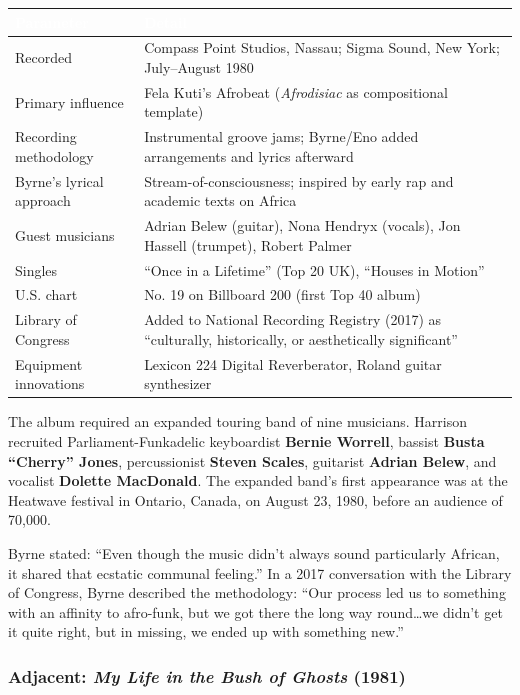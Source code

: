 \documentclass[11pt,letterpaper]{article}
\newcommand{\tableheader}[1]{\textbf{\sffamily\textcolor{white}{#1}}}
\begin{document}
\begin{center}
\begin{tabularx}{\textwidth}{L{3.5cm}X}
\toprule
{}
\tableheader{Parameter} & \tableheader{Detail} \\
\midrule
Recorded & Compass Point Studios, Nassau; Sigma Sound, New York; July--August 1980 \\
Primary influence & Fela Kuti's Afrobeat (\textit{Afrodisiac} as compositional template) \\
Recording methodology & Instrumental groove jams; Byrne/Eno added arrangements and lyrics afterward \\
Byrne's lyrical approach & Stream-of-consciousness; inspired by early rap and academic texts on Africa \\
Guest musicians & Adrian Belew (guitar), Nona Hendryx (vocals), Jon Hassell (trumpet), Robert Palmer \\
Singles & ``Once in a Lifetime'' (Top 20 UK), ``Houses in Motion'' \\
U.S. chart & No. 19 on Billboard 200 (first Top 40 album) \\
Library of Congress & Added to National Recording Registry (2017) as ``culturally, historically, or aesthetically significant'' \\
Equipment innovations & Lexicon 224 Digital Reverberator, Roland guitar synthesizer \\
\bottomrule
\end{tabularx}
\end{center}

The album required an expanded touring band of nine musicians. Harrison recruited Parliament-Funkadelic keyboardist \textbf{Bernie Worrell}, bassist \textbf{Busta ``Cherry'' Jones}, percussionist \textbf{Steven Scales}, guitarist \textbf{Adrian Belew}, and vocalist \textbf{Dolette MacDonald}. The expanded band's first appearance was at the Heatwave festival in Ontario, Canada, on August 23, 1980, before an audience of 70,000.

Byrne stated: ``Even though the music didn't always sound particularly African, it shared that ecstatic communal feeling.'' In a 2017 conversation with the Library of Congress, Byrne described the methodology: ``Our process led us to something with an affinity to afro-funk, but we got there the long way round\ldots we didn't get it quite right, but in missing, we ended up with something new.''

\subsubsection{Adjacent: \textit{My Life in the Bush of Ghosts} (1981)}
\end{document}
